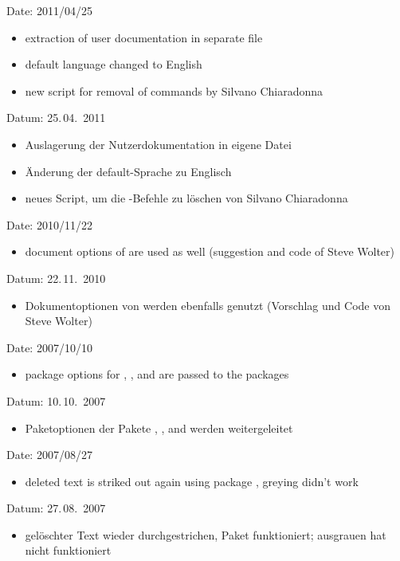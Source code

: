 
\ifENGLISH
	Date: 2011/04/25
	\begin{itemize}
		\item extraction of user documentation in separate file
		\item default language changed to English
		\item new script for removal of  commands by Silvano Chiaradonna
	\end{itemize}
\fi
	\ifGERMAN
		Datum: 25.\,04.~2011
		\begin{itemize}
			\item Auslagerung der Nutzerdokumentation in eigene Datei
			\item Änderung der default-Sprache zu Englisch
			\item neues Script, um die -Befehle zu löschen von Silvano Chiaradonna
		\end{itemize}
	\fi


\ifENGLISH
	Date: 2010/11/22
	\begin{itemize}
	\item document options of  are used as well (suggestion and code of Steve Wolter)
	\end{itemize}
\fi
	\ifGERMAN
		Datum: 22.\,11.~2010
		\begin{itemize}
		\item Dokumentoptionen von  werden ebenfalls genutzt (Vorschlag und Code von Steve Wolter)
		\end{itemize}
	\fi


\ifENGLISH
	Date: 2007/10/10
	\begin{itemize}
	\item package options for , , and  are passed to the packages
	\end{itemize}
\fi
	\ifGERMAN
		Datum: 10.\,10.~2007
		\begin{itemize}
		\item Paketoptionen der Pakete , , and  werden weitergeleitet
		\end{itemize}
	\fi


\ifENGLISH
	Date: 2007/08/27
	\begin{itemize}
	\item deleted text is striked out again using package , greying didn't work
	\end{itemize}
\fi
	\ifGERMAN
		Datum: 27.\,08.~2007
		\begin{itemize}
		\item gelöschter Text wieder durchgestrichen, Paket  funktioniert; ausgrauen hat nicht funktioniert
		\end{itemize}
	\fi

